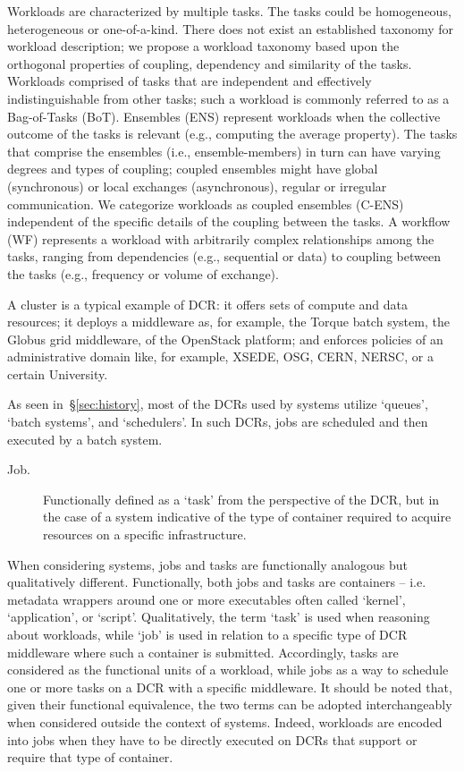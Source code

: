\documentclass{sig-alternate}
\begin{document}
Workloads are characterized by multiple tasks. The tasks could be homogeneous,
heterogeneous or one-of-a-kind.  There does not exist an established taxonomy
for workload description; we propose a workload taxonomy based upon the
orthogonal properties of coupling, dependency and similarity of the tasks.
Workloads comprised of tasks that are independent and effectively
indistinguishable from other tasks; such a workload is commonly referred to as a
Bag-of-Tasks (BoT). Ensembles (ENS) represent workloads when the collective
outcome of the tasks is relevant (e.g., computing the average property). The
tasks that comprise the ensembles (i.e., ensemble-members) in turn can have
varying degrees and types of coupling; coupled ensembles might have global
(synchronous) or local exchanges (asynchronous), regular or irregular
communication. We categorize workloads as coupled ensembles (C-ENS) independent
of the specific details of the coupling between the tasks. A workflow (WF)
represents a workload with arbitrarily complex relationships among the tasks,
ranging from dependencies (e.g., sequential or data) to coupling between the
tasks (e.g., frequency or volume of exchange).

A cluster is a typical example of DCR: it offers sets of compute and data
resources; it deploys a middleware as, for example, the Torque batch system, the
Globus grid middleware, of the OpenStack platform; and enforces policies of an
administrative domain like, for example, XSEDE, OSG, CERN, NERSC, or a certain
University.

As seen in~\S\ref{sec:history}, most of the DCRs used by \pilotjob systems
utilize `queues', `batch systems', and `schedulers'. In such DCRs, jobs are
scheduled and then executed by a batch system.

\begin{description}

\item[Job.] Functionally defined as a `task' from the perspective of the DCR,
but in the case of a \pilotjob system indicative of the type of container
required to acquire resources on a specific infrastructure.

\end{description}

When considering \pilotjob systems, jobs and tasks are functionally analogous
but qualitatively different. Functionally, both jobs and tasks are containers --
i.e. metadata wrappers around one or more executables often called `kernel',
`application', or `script'. Qualitatively, the term `task' is used when
reasoning about workloads, while `job' is used in relation to a specific type of
DCR middleware where such a container is submitted. Accordingly, tasks are
considered as the functional units of a workload, while jobs as a way to
schedule one or more tasks on a DCR with a specific middleware. It should be
noted that, given their functional equivalence, the two terms can be adopted
interchangeably when considered outside the context of \pilotjob systems.
Indeed, workloads are encoded into jobs when they have to be directly executed
on DCRs that support or require that type of container.
\end{document}
